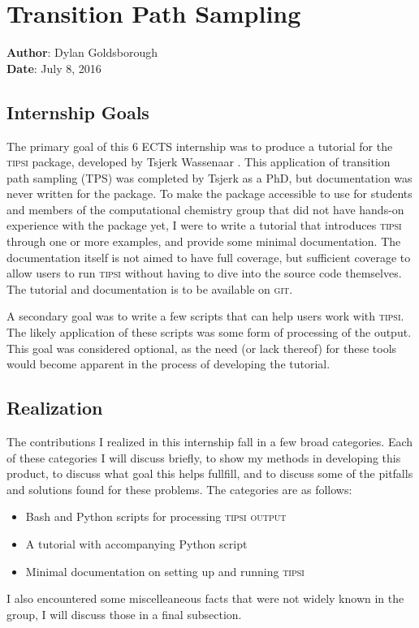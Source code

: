\documentclass[]{article}
\begin{document}
\section*{Transition Path Sampling}
\textbf{Author}: Dylan Goldsborough\\
\textbf{Date}: July 8, 2016

\subsection*{Internship Goals}

The primary goal of this 6 ECTS internship was to produce a tutorial for the \textsc{tipsi} package, developed by Tsjerk Wassenaar \cite{tipsi}. This application of transition path sampling (TPS) was completed by Tsjerk as a PhD, but documentation was never written for the package. To make the package accessible to use for students and members of the computational chemistry group that did not have hands-on experience with the package yet, I were to write a tutorial that introduces \textsc{tipsi} through  one or more examples, and provide some minimal documentation. The documentation itself is not aimed to have full coverage, but sufficient coverage to allow users to run \textsc{tipsi} without having to dive into the source code themselves. The tutorial and documentation is to be available on \textsc{git}.

A secondary goal was to write a few scripts that can help users work with \textsc{tipsi}. The likely application of these scripts was some form of processing of the output. This goal was considered optional, as the need (or lack thereof) for these tools would become apparent in the process of developing the tutorial.

\subsection*{Realization}

The contributions I realized in this internship fall in a few broad categories. Each of these categories I will discuss briefly, to show my methods in developing this product, to discuss what goal this helps fullfill, and to discuss some of the pitfalls and solutions found for these problems. The categories are as follows:
%
\begin{itemize}
\item Bash and Python scripts for processing \textsc{tipsi output}
\item A tutorial with accompanying Python script
\item Minimal documentation on setting up and running \textsc{tipsi}
\end{itemize}
%
I also encountered some miscelleaneous facts that were not widely known in the group, I will discuss those in a final subsection.
\end{document}
